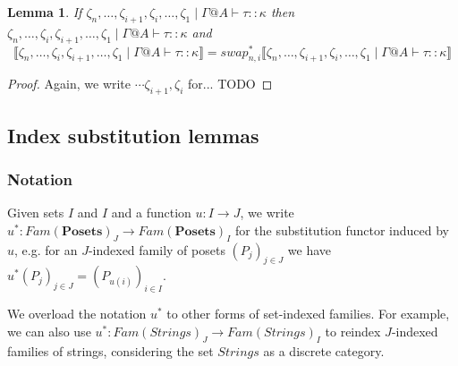 \documentclass{article}
\newtheorem{lemma}{Lemma}
\newcommand{\mbf}{\mathbf}
\newcommand{\sem}[1]{\llbracket #1 \rrbracket}
\newcommand{\sdisp}[1]{
\left( #1 \right)
}
\begin{document}
\begin{lemma}
If $\zeta_n,\ldots,\zeta_{i+1},\zeta_i,\ldots,\zeta_1 \mid \Gamma@A \vdash \tau :: \kappa$ then $\zeta_n,\ldots,\zeta_{i},\zeta_{i+1},\ldots,\zeta_1 \mid \Gamma@A \vdash \tau :: \kappa$ and $$\sem{\zeta_n,\ldots,\zeta_{i},\zeta_{i+1},\ldots,\zeta_1 \mid \Gamma@A \vdash \tau :: \kappa} = \mathit{swap}_{n,i}^* \sem{\zeta_n,\ldots,\zeta_{i+1},\zeta_i,\ldots,\zeta_1 \mid \Gamma@A \vdash \tau :: \kappa}$$
\label{K-exchng}
\end{lemma}

\begin{proof}
Again, we write $\cdots \zeta_{i+1},\zeta_i$ for...
TODO
\end{proof}

\subsection*{Index substitution lemmas}

\subsubsection*{Notation}

Given sets $I$ and $I$ and a function $u : I \to J$, we write $u^* : \mathit{Fam}(\mbf{Posets})_J \to \mathit{Fam}(\mbf{Posets})_I$ for the substitution functor induced by $u$, e.g. for an $J$-indexed family of posets $\sdisp{P_j}_{j \in J}$ we have $u^* \sdisp{P_j}_{j \in J} = \sdisp{ P_{u(i)} }_{i \in I}$.

We overload the notation $u^*$ to other forms of set-indexed families. For example, we can also use $u^* : \mathit{Fam}(\mathit{Strings})_J \to \mathit{Fam}(\mathit{Strings})_I$ to reindex $J$-indexed families of strings, considering the set $\mathit{Strings}$ as a discrete category. 
\end{document}
